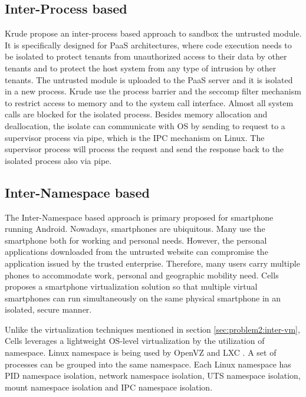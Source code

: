 \subsection{Inter-Process based}
\label{sec:problem2:inter-process}

Krude \etal \cite{Krude} propose an inter-process based approach to sandbox the
untrusted module. It is specifically designed for PaaS architectures, where
code execution needs to be isolated to protect tenants from unauthorized access
to their data by other tenants and to protect the host system from any type of
intrusion by other tenants. The untrusted module is uploaded to the PaaS server
and it is isolated in a new process. Krude \etal use the process barrier and
the seccomp filter mechanism to restrict access to memory and to the system
call interface. Almost all system calls are blocked for the isolated process.
Besides memory allocation and deallocation, the isolate can communicate with OS
by sending to request to a supervisor process via pipe, which is the IPC
mechanism on Linux. The supervisor process will process the request and send
the response back to the isolated process also via pipe.

\subsection{Inter-Namespace based}
\label{sec:problem2:inter-namespace}

The Inter-Namespace based approach is primary proposed for smartphone running
Android. Nowadays, smartphones are ubiquitous. Many use the smartphone both for
working and personal needs. However, the personal applications downloaded from
the untrusted website can compromise the application issued by the trusted
enterprise. Therefore, many users carry multiple phones to accommodate work,
personal and geographic mobility need. Cells proposes a smartphone
virtualization solution so that multiple virtual smartphones can run
simultaneously on the same physical smartphone in an isolated, secure manner.

Unlike the virtualization techniques mentioned in section
\ref{sec:problem2:inter-vm}, Cells leverages a lightweight OS-level
virtualization by the utilization of namespace. Linux namespace is being used
by OpenVZ \cite{openvz} and LXC \cite{lxc}. A set of processes can be grouped
into the same namespace. Each Linux namespace has PID namespace isolation,
network namespace isolation, UTS namespace isolation, mount namespace isolation
and IPC namespace isolation.


